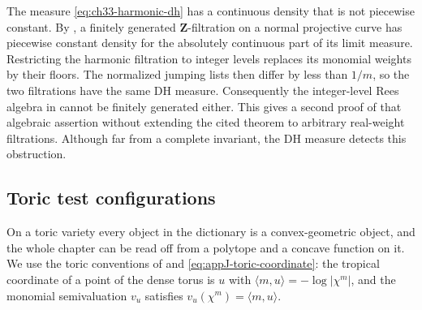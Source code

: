 \begin{remark}
\label{rem:ch33-harmonic-reverse}
The measure \eqref{eq:ch33-harmonic-dh} has a continuous density that is not
piecewise constant.  By \cite[Theorem~5.10]{BHJ17}, a finitely generated
$\mathbf Z$-filtration on a normal projective curve has piecewise constant
density for the absolutely continuous part of its limit measure.
Restricting the harmonic filtration to integer levels replaces its monomial
weights by their floors.  The normalized jumping lists then differ by
less than $1/m$, so the two filtrations have the same DH measure.
Consequently the integer-level Rees algebra in
 cannot be finitely generated either.
This gives a second proof of that algebraic assertion without extending
the cited theorem to arbitrary real-weight filtrations.  Although far
from a complete invariant, the DH measure detects this obstruction.
\end{remark}

\subsection{Toric test configurations}
\label{sec:ch33-example-toric}

On a toric variety every object in the dictionary is a convex-geometric
object, and the whole chapter can be read off from a polytope and a concave
function on it.  We use the toric conventions of
 and \eqref{eq:appJ-toric-coordinate}: the
tropical coordinate of a point of the dense torus is
$u$ with $\langle m,u\rangle=-\log|\chi^m|$, and the monomial
semivaluation $v_u$ satisfies $v_u(\chi^m)=\langle m,u\rangle$.

